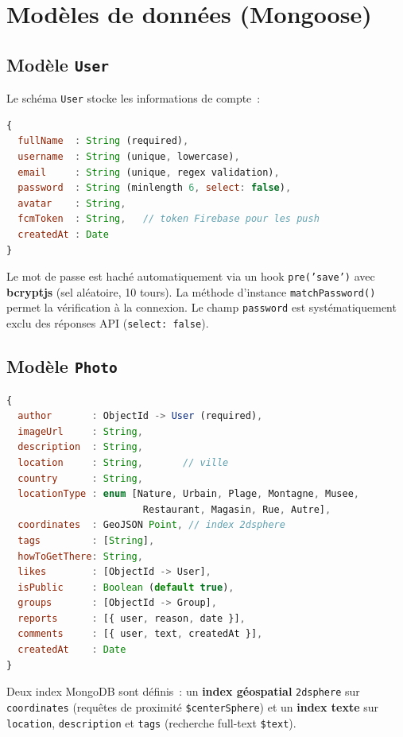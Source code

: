 \documentclass[12pt, a4paper, openany]{report}
\begin{document}
\section{Modèles de données (Mongoose)}

\subsection{Modèle \texttt{User}}

Le schéma \texttt{User} stocke les informations de compte~:

\begin{lstlisting}[language=JavaScript, caption=Schéma User.js (extrait)]
{
  fullName  : String (required),
  username  : String (unique, lowercase),
  email     : String (unique, regex validation),
  password  : String (minlength 6, select: false),
  avatar    : String,
  fcmToken  : String,   // token Firebase pour les push
  createdAt : Date
}
\end{lstlisting}

Le mot de passe est haché automatiquement via un hook \texttt{pre('save')} avec \textbf{bcryptjs}
(sel aléatoire, 10 tours). La méthode d'instance \texttt{matchPassword()} permet la vérification
à la connexion. Le champ \texttt{password} est systématiquement exclu des réponses API
(\texttt{select: false}).

\subsection{Modèle \texttt{Photo}}

\begin{lstlisting}[language=JavaScript, caption=Schéma Photo.js (extrait)]
{
  author       : ObjectId -> User (required),
  imageUrl     : String,
  description  : String,
  location     : String,       // ville
  country      : String,
  locationType : enum [Nature, Urbain, Plage, Montagne, Musee,
                        Restaurant, Magasin, Rue, Autre],
  coordinates  : GeoJSON Point, // index 2dsphere
  tags         : [String],
  howToGetThere: String,
  likes        : [ObjectId -> User],
  isPublic     : Boolean (default true),
  groups       : [ObjectId -> Group],
  reports      : [{ user, reason, date }],
  comments     : [{ user, text, createdAt }],
  createdAt    : Date
}
\end{lstlisting}

Deux index MongoDB sont définis~: un \textbf{index géospatial} \texttt{2dsphere} sur
\texttt{coordinates} (requêtes de proximité \texttt{\$centerSphere}) et un \textbf{index texte}
sur \texttt{location}, \texttt{description} et \texttt{tags} (recherche full-text
\texttt{\$text}).
\end{document}
